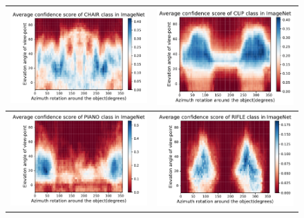 \begin{figure}[]
\centering
\tabcolsep=0.03cm
   \begin{tabular}{c|c}
\includegraphics[width = 9cm]{supimages/bias/chair_Average_2D.pdf}&
\includegraphics[width = 9cm]{supimages/bias/cup_Average_2D.pdf}\\\hline
\includegraphics[width = 9cm]{supimages/bias/piano_Average_2D.pdf}&
\includegraphics[width = 9cm]{supimages/bias/rifle_Average_2D.pdf}\\\hline

\end{tabular}
\end{figure}
